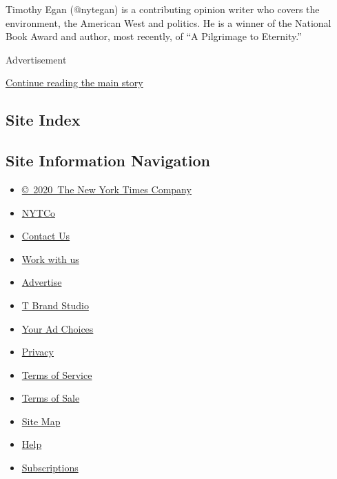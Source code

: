 Timothy Egan (@nytegan) is a contributing opinion writer who covers the
environment, the American West and politics. He is a winner of the
National Book Award and author, most recently, of ``A Pilgrimage to
Eternity.''

Advertisement

\protect\hyperlink{after-bottom}{Continue reading the main story}

\hypertarget{site-index}{%
\subsection{Site Index}\label{site-index}}

\hypertarget{site-information-navigation}{%
\subsection{Site Information
Navigation}\label{site-information-navigation}}

\begin{itemize}
\tightlist
\item
  \href{https://help.nytimes3xbfgragh.onion/hc/en-us/articles/115014792127-Copyright-notice}{©~2020~The
  New York Times Company}
\end{itemize}

\begin{itemize}
\tightlist
\item
  \href{https://www.nytco.com/}{NYTCo}
\item
  \href{https://help.nytimes3xbfgragh.onion/hc/en-us/articles/115015385887-Contact-Us}{Contact
  Us}
\item
  \href{https://www.nytco.com/careers/}{Work with us}
\item
  \href{https://nytmediakit.com/}{Advertise}
\item
  \href{http://www.tbrandstudio.com/}{T Brand Studio}
\item
  \href{https://www.nytimes3xbfgragh.onion/privacy/cookie-policy\#how-do-i-manage-trackers}{Your
  Ad Choices}
\item
  \href{https://www.nytimes3xbfgragh.onion/privacy}{Privacy}
\item
  \href{https://help.nytimes3xbfgragh.onion/hc/en-us/articles/115014893428-Terms-of-service}{Terms
  of Service}
\item
  \href{https://help.nytimes3xbfgragh.onion/hc/en-us/articles/115014893968-Terms-of-sale}{Terms
  of Sale}
\item
  \href{https://spiderbites.nytimes3xbfgragh.onion}{Site Map}
\item
  \href{https://help.nytimes3xbfgragh.onion/hc/en-us}{Help}
\item
  \href{https://www.nytimes3xbfgragh.onion/subscription?campaignId=37WXW}{Subscriptions}
\end{itemize}
